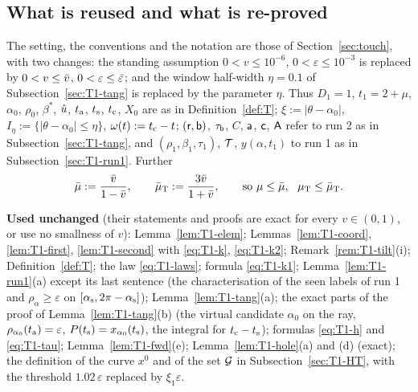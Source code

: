 \subsection{What is reused and what is re-proved}\label{sec:HTp-reuse}

The setting, the conventions and the notation are those of Section~\ref{sec:touch}, with two changes: the standing assumption
$0<v\le10^{-6}$, $0<\varepsilon\le10^{-3}$ is replaced by $0<v\le\bar v$, $0<\varepsilon\le\bar\varepsilon$; and the window half-width $\eta=0.1$
of Subsection~\ref{sec:T1-tang} is replaced by the parameter $\eta$. Thus $D_1=1$, $t_1=2+\mu$, $\alpha_0$, $\rho_0$, $\beta^*$, $\hat u$,
$t_{\mathrm a}$, $t_{\mathrm s}$, $t_{\mathrm c}$, $X_0$ are as in Definition~\ref{def:T}; $\xi:=|\theta-\alpha_0|$, $I_\eta:=\{|\theta-\alpha_0|\le\eta\}$,
$\omega(t):=t_{\mathrm c}-t$; $(\mathsf r,\mathsf b)$, $\tau_{\mathsf b}$, $C$, $\mathsf a$, $\mathsf c$, $\mathsf A$ refer to run 2 as in Subsection~\ref{sec:T1-tang}, and
$(\rho_1,\beta_1,\tau_1)$, $\mathcal T$, $y(\alpha,t_1)$ to run 1 as in Subsection~\ref{sec:T1-run1}. Further
\[
\bar\mu:=\frac{\bar v}{1-\bar v},\qquad\bar\mu_{\mathrm T}:=\frac{3\bar v}{1+\bar v},\qquad\text{so }\mu\le\bar\mu,\ \ \mu_{\mathrm T}\le\bar\mu_{\mathrm T} .
\]

\noindent\textbf{Used unchanged} (their statements and proofs are exact for every $v\in(0,1)$, or use no smallness of $v$):
Lemma~\ref{lem:T1-elem}; Lemmas~\ref{lem:T1-coord}, \ref{lem:T1-first}, \ref{lem:T1-second} with \eqref{eq:T1-k}, \eqref{eq:T1-k2};
Remark~\ref{rem:T1-tilt}(i); Definition~\ref{def:T}; the law \eqref{eq:T1-laws}; formula \eqref{eq:T1-k1}; Lemma~\ref{lem:T1-run1}(a)
except its last sentence (the characterisation of the seen labels of run 1 and $\rho_\alpha\ge\varepsilon$ on $[\alpha_{\mathrm s},2\pi-\alpha_{\mathrm s}]$);
Lemma~\ref{lem:T1-tang}(a); the exact parts of the proof of Lemma~\ref{lem:T1-tang}(b) (the virtual candidate $\alpha_0$ on the ray,
$\rho_{\alpha_0}(t_{\mathrm a})=\varepsilon$, $P(t_{\mathrm s})=x_{\alpha_0}(t_{\mathrm s})$, the integral for $t_{\mathrm c}-t_{\mathrm s}$); formulas \eqref{eq:T1-h} and
\eqref{eq:T1-tau}; Lemma~\ref{lem:T1-fwd}(e); Lemma~\ref{lem:T1-hole}(a) and (d) (exact); the definition of the curve $x^0$ and of the
set $\mathcal G$ in Subsection~\ref{sec:T1-HT}, with the threshold $1.02\,\varepsilon$ replaced by $\xi_1\varepsilon$.

